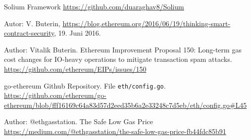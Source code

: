 \begin{thebibliography}{99}
 Solium Framework \url{https://github.com/duaraghav8/Solium}

 Autor: V. Buterin, \url{https://blog.ethereum.org/2016/06/19/thinking-smart-contract-security}, 19. Juni 2016.


 Author: Vitalik Buterin. Ethereum Improvement Proposal 150: Long-term gas cost changes for IO-heavy operations to mitigate transaction spam attacks. \url{https://github.com/ethereum/EIPs/issues/150}


 go-ethereum Github Repository. File \texttt{eth/config.go}. \url{https://github.com/ethereum/go-ethereum/blob/fff16169c64a83d57d2eed35b6a2e33248c7d5eb/eth/config.go\#L45}

 Author: @ethgasstation. The Safe Low Gas Price \url{https://medium.com/@ethgasstation/the-safe-low-gas-price-fb44fdc85b91}



\end{thebibliography}

